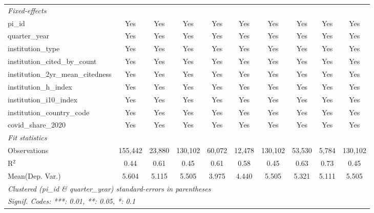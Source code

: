 \begin{tabular}{lccccccccc}
   \midrule
   \emph{Fixed-effects}\\
   pi\_id                                                      & Yes             & Yes             & Yes            & Yes           & Yes           & Yes            & Yes            & Yes           & Yes\\  
   quarter\_year                                               & Yes             & Yes             & Yes            & Yes           & Yes           & Yes            & Yes            & Yes           & Yes\\  
   institution\_type                                           & Yes             & Yes             & Yes            & Yes           & Yes           & Yes            & Yes            & Yes           & Yes\\  
   institution\_cited\_by\_count                               & Yes             & Yes             & Yes            & Yes           & Yes           & Yes            & Yes            & Yes           & Yes\\  
   institution\_2yr\_mean\_citedness                           & Yes             & Yes             & Yes            & Yes           & Yes           & Yes            & Yes            & Yes           & Yes\\  
   institution\_h\_index                                       & Yes             & Yes             & Yes            & Yes           & Yes           & Yes            & Yes            & Yes           & Yes\\  
   institution\_i10\_index                                     & Yes             & Yes             & Yes            & Yes           & Yes           & Yes            & Yes            & Yes           & Yes\\  
   institution\_country\_code                                  & Yes             & Yes             & Yes            & Yes           & Yes           & Yes            & Yes            & Yes           & Yes\\  
   covid\_share\_2020                                          & Yes             & Yes             & Yes            & Yes           & Yes           & Yes            & Yes            & Yes           & Yes\\  
   \midrule
   \emph{Fit statistics}\\
   Observations                                                & 155,442         & 23,880          & 130,102        & 60,072        & 12,478        & 130,102        & 53,530         & 5,784         & 130,102\\  
   R$^2$                                                       & 0.44            & 0.61            & 0.45           & 0.61          & 0.58          & 0.45           & 0.63           & 0.73          & 0.45\\  
Mean(Dep. Var.) & 5.604 & 5.115 & 5.505 & 3.975 & 4.440 & 5.505 & 5.321 & 5.111 & 5.505 \\
   \midrule \midrule
   \multicolumn{10}{l}{\emph{Clustered (pi\_id \& quarter\_year) standard-errors in parentheses}}\\
   \multicolumn{10}{l}{\emph{Signif. Codes: ***: 0.01, **: 0.05, *: 0.1}}\\
\end{tabular}
\par\endgroup
